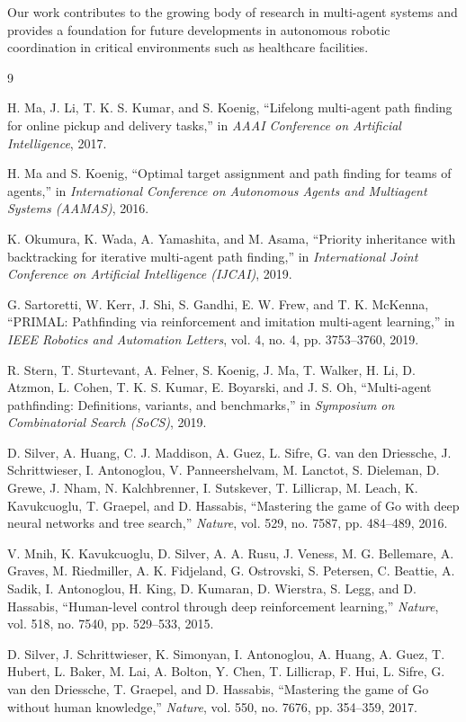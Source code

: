 \documentclass[12pt, a4paper]{report}
\begin{document}
Our work contributes to the growing body of research in multi-agent systems and provides a foundation for future developments in autonomous robotic coordination in critical environments such as healthcare facilities.

\begin{thebibliography}{9}

H. Ma, J. Li, T. K. S. Kumar, and S. Koenig, ``Lifelong multi-agent path finding for online pickup and delivery tasks,'' in \emph{AAAI Conference on Artificial Intelligence}, 2017.

H. Ma and S. Koenig, ``Optimal target assignment and path finding for teams of agents,'' in \emph{International Conference on Autonomous Agents and Multiagent Systems (AAMAS)}, 2016.

K. Okumura, K. Wada, A. Yamashita, and M. Asama, ``Priority inheritance with backtracking for iterative multi-agent path finding,'' in \emph{International Joint Conference on Artificial Intelligence (IJCAI)}, 2019.

G. Sartoretti, W. Kerr, J. Shi, S. Gandhi, E. W. Frew, and T. K. McKenna, ``PRIMAL: Pathfinding via reinforcement and imitation multi-agent learning,'' in \emph{IEEE Robotics and Automation Letters}, vol. 4, no. 4, pp. 3753--3760, 2019.

R. Stern, T. Sturtevant, A. Felner, S. Koenig, J. Ma, T. Walker, H. Li, D. Atzmon, L. Cohen, T. K. S. Kumar, E. Boyarski, and J. S. Oh, ``Multi-agent pathfinding: Definitions, variants, and benchmarks,'' in \emph{Symposium on Combinatorial Search (SoCS)}, 2019.

D. Silver, A. Huang, C. J. Maddison, A. Guez, L. Sifre, G. van den Driessche, J. Schrittwieser, I. Antonoglou, V. Panneershelvam, M. Lanctot, S. Dieleman, D. Grewe, J. Nham, N. Kalchbrenner, I. Sutskever, T. Lillicrap, M. Leach, K. Kavukcuoglu, T. Graepel, and D. Hassabis, ``Mastering the game of Go with deep neural networks and tree search,'' \emph{Nature}, vol. 529, no. 7587, pp. 484--489, 2016.

V. Mnih, K. Kavukcuoglu, D. Silver, A. A. Rusu, J. Veness, M. G. Bellemare, A. Graves, M. Riedmiller, A. K. Fidjeland, G. Ostrovski, S. Petersen, C. Beattie, A. Sadik, I. Antonoglou, H. King, D. Kumaran, D. Wierstra, S. Legg, and D. Hassabis, ``Human-level control through deep reinforcement learning,'' \emph{Nature}, vol. 518, no. 7540, pp. 529--533, 2015.

D. Silver, J. Schrittwieser, K. Simonyan, I. Antonoglou, A. Huang, A. Guez, T. Hubert, L. Baker, M. Lai, A. Bolton, Y. Chen, T. Lillicrap, F. Hui, L. Sifre, G. van den Driessche, T. Graepel, and D. Hassabis, ``Mastering the game of Go without human knowledge,'' \emph{Nature}, vol. 550, no. 7676, pp. 354--359, 2017.

\end{thebibliography}
\end{document}
